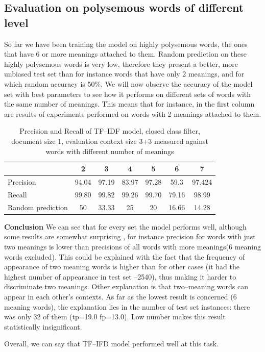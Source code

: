 \subsection{ Evaluation on polysemous words of different level}
So far we have been training the model on highly polysemous words, the ones that have 6 or more 
meanings attached to them. Random prediction on these highly polysemous words is very low, therefore
they present a better, more unbiased test set than for instance words that have only 2 meanings, and 
for which random accuracy is 50\%. We will now observe the accuracy of the model set with best
parameters to see how it performs on different sets of words with the same number of meanings. This means
that for instance, in the first column are results of experiments performed on words with 2 meanings attached to them.

\begin{table}[h!]
\begin{tabular}{ l | c c c c c c   }
     & 2 & 3 & 4 & 5 & 6& 7   \\
 \hline
Precision & 94.04 &97.19 &83.97 &97.28 &59.3 &97.424 \\
Recall   &  99.80 &99.82 &99.26 &99.70 &79.16 &98.99   \\
Random prediction    & 50 & 33.33 & 25 & 20 & 16.66 & 14.28      \\
\end{tabular}
\caption{Precision and Recall of TF--IDF model, closed class filter, document size 1, evaluation context size 3+3 measured against words with different number of meanings}
\end{table} 

\textbf{Conclusion}
We can see that for every set the model performs well, although some results are somewhat surprising
, for instance precision for words with just two meanings is lower than precisions of all words with 
more meanings(6 meaning words excluded). This could be explained with the fact that the frequency of appearance 
of two meaning  words is higher than for other cases (it had the highest number of appearance in test
set --2540), thus making it harder to discriminate two meanings. Other explanation is that two--meaning words can appear in each other's contexts. As far as the lowest result is concerned (6 meaning words), the explanation lies in the number of test set instances: there was only 32 of them (tp=19.0 fp=13.0). Low number makes this result statistically insignificant. 

Overall, we can say that TF--IFD model performed well at this task. 

